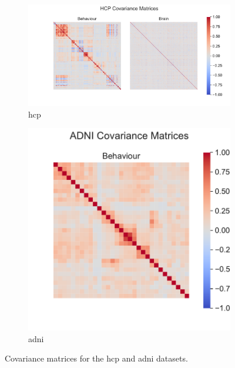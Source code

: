 \begin{figure}
\centering
\begin{subfigure}{0.66\linewidth}
\centering
\includegraphics[width=\linewidth]{figures/covariance/hcp_covariance}
\caption{\acrshort{hcp}}
\end{subfigure}
%
\begin{subfigure}{0.33\linewidth}
\centering
\includegraphics[width=\linewidth]{figures/covariance/adni_covariance}
\caption{\acrshort{adni}}
\end{subfigure}
\caption{Covariance matrices for the \acrshort{hcp} and \acrshort{adni} datasets.}
\label{fig:covariance-matrices-real}
\end{figure}

